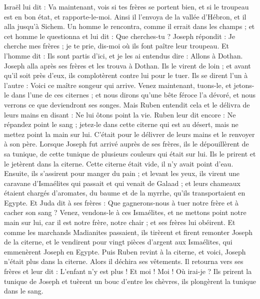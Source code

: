 \begin{multicols}{2}
Israël lui dit : Va maintenant, vois si tes frères se portent bien, et si le troupeau est en bon état, et rapporte-le-moi. Ainsi il l'envoya de la vallée d’Hébron, et il alla jusqu'à Sichem.
Un homme le rencontra, comme il errait dans les champs ; et cet homme le questionna et lui dit : Que cherches-tu ?
Joseph répondit : Je cherche mes frères ; je te prie, dis-moi où ils font paître leur troupeau.
Et l'homme dit : Ils sont partis d'ici, et je les ai entendus dire : Allons à Dothan. Joseph alla après ses frères et les trouva à Dothan.
Ils le virent de loin ; et avant qu'il soit près d’eux, ils complotèrent contre lui pour le tuer.
Ils se dirent l'un à l'autre : Voici ce maître songeur qui arrive.
Venez maintenant, tuons-le, et jetons-le dans l’une de ces citernes ; et nous dirons qu'une bête féroce l'a dévoré, et nous verrons ce que deviendront ses songes.
Mais Ruben entendit cela et le délivra de leurs mains en disant : Ne lui ôtons point la vie.
Ruben leur dit encore : Ne répandez point le sang ; jetez-le dans cette citerne qui est au désert, mais ne mettez point la main sur lui. C'était pour le délivrer de leurs mains et le renvoyer à son père.
Lorsque Joseph fut arrivé auprès de ses frères, ils le dépouillèrent de sa tunique, de cette tunique de plusieurs couleurs qui était sur lui.
Ils le prirent et le jetèrent dans la citerne.  Cette citerne était vide, il n'y avait point d'eau.
Ensuite, ils s'assirent pour manger du pain ; et levant les yeux, ils virent une caravane d'Ismaélites qui passait et qui venait de Galaad ; et leurs chameaux étaient chargés d’aromates, du baume et de la myrrhe, qu’ils transportaient en Egypte.
Et Juda dit à ses frères : Que gagnerons-nous à tuer notre frère et à cacher son sang ?
Venez, vendons-le à ces Ismaélites, et ne mettons point notre main sur lui, car il est notre frère, notre chair ; et ses frères lui obéirent.
Et comme les marchands Madianites passaient, ils tirèrent et firent remonter Joseph de la citerne, et le vendirent pour vingt pièces d'argent aux Ismaélites, qui emmenèrent Joseph en Egypte.
Puis Ruben revint à la citerne, et voici, Joseph n'était plus dans la citerne. Alors il déchira ses vêtements.
Il retourna vers ses frères et leur dit : L'enfant n’y est plus ! Et moi ! Moi ! Où irai-je ?
Ils prirent la tunique de Joseph et tuèrent un bouc d'entre les chèvres, ils plongèrent la tunique dans le sang.

\end{multicols}
